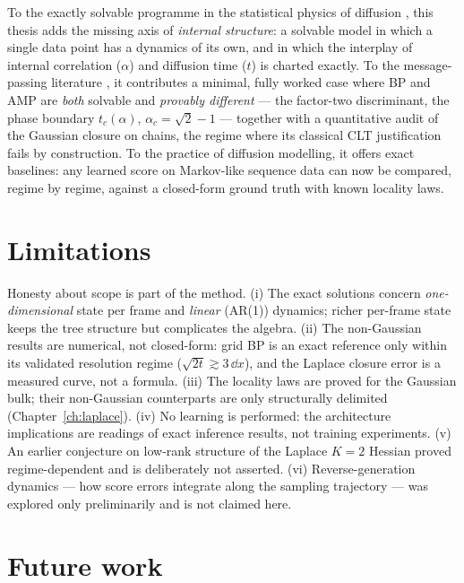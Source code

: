 To the exactly solvable programme in the statistical physics of diffusion
\citep{biroli2023generative, biroli2024dynamical, ghio2024sampling}, this
thesis adds the missing axis of \emph{internal structure}: a solvable
model in which a single data point has a dynamics of its own, and in which
the interplay of internal correlation ($\alpha$) and diffusion time ($t$)
is charted exactly. To the message-passing literature
\citep{mezard2009information, zdeborova2016statistical}, it contributes a
minimal, fully worked case where BP and AMP are \emph{both} solvable and
\emph{provably different} --- the factor-two discriminant, the phase
boundary $t_c(\alpha)$, $\alpha_c = \sqrt{2}-1$ --- together with a
quantitative audit of the Gaussian closure on chains, the regime where its
classical CLT justification fails by construction. To the practice of
diffusion modelling, it offers exact baselines: any learned score on
Markov-like sequence data can now be compared, regime by regime, against
a closed-form ground truth with known locality laws.

\section{Limitations}

Honesty about scope is part of the method. (i) The exact solutions concern
\emph{one-dimensional} state per frame and \emph{linear} (AR(1)) dynamics;
richer per-frame state keeps the tree structure but complicates the
algebra. (ii) The non-Gaussian results are numerical, not closed-form:
grid BP is an exact reference only within its validated resolution regime
($\sqrt{2t} \gtrsim 3\,\dd x$), and the Laplace closure error is a
measured curve, not a formula. (iii) The locality laws are proved for the
Gaussian bulk; their non-Gaussian counterparts are only structurally
delimited (Chapter~\ref{ch:laplace}). (iv) No learning is performed: the
architecture implications are readings of exact inference results, not
training experiments. (v) An earlier conjecture on low-rank structure of
the Laplace $K = 2$ Hessian proved regime-dependent and is deliberately
not asserted. (vi) Reverse-generation dynamics --- how score errors
integrate along the sampling trajectory --- was explored only
preliminarily and is not claimed here.

\section{Future work}

